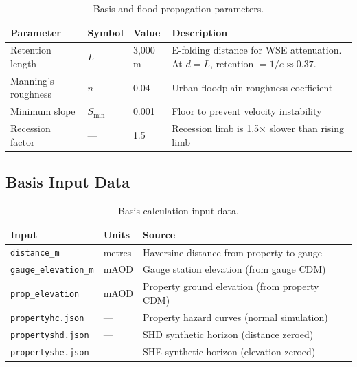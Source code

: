 \documentclass[11pt,a4paper]{article}
\begin{document}
\begin{table}[H]
    \centering
    \begin{tabular}{lllp{5.5cm}}
        \toprule
        \textbf{Parameter} & \textbf{Symbol} & \textbf{Value} & \textbf{Description} \\
        \midrule
        Retention length        & $L$                     & 3{,}000\,m    & E-folding distance for WSE attenuation. At $d = L$, retention $= 1/e \approx 0.37$. \\
        Manning's roughness     & $n$                     & 0.04          & Urban floodplain roughness coefficient \\
        Minimum slope           & $S_{\text{min}}$        & 0.001         & Floor to prevent velocity instability \\
        Recession factor        & ---                     & 1.5           & Recession limb is 1.5$\times$ slower than rising limb \\
        \bottomrule
    \end{tabular}
    \caption{Basis and flood propagation parameters.}
    \label{tab:basis_params}
\end{table}

\subsection{Basis Input Data}

\begin{table}[H]
    \centering
    \begin{tabular}{llp{7cm}}
        \toprule
        \textbf{Input} & \textbf{Units} & \textbf{Source} \\
        \midrule
        \texttt{distance\_m}        & metres  & Haversine distance from property to gauge \\
        \texttt{gauge\_elevation\_m} & mAOD   & Gauge station elevation (from gauge CDM) \\
        \texttt{prop\_elevation}     & mAOD   & Property ground elevation (from property CDM) \\
        \texttt{propertyhc.json}     & ---    & Property hazard curves (normal simulation) \\
        \texttt{propertyshd.json}    & ---    & SHD synthetic horizon (distance zeroed) \\
        \texttt{propertyshe.json}    & ---    & SHE synthetic horizon (elevation zeroed) \\
        \bottomrule
    \end{tabular}
    \caption{Basis calculation input data.}
    \label{tab:basis_inputs}
\end{table}
\end{document}
